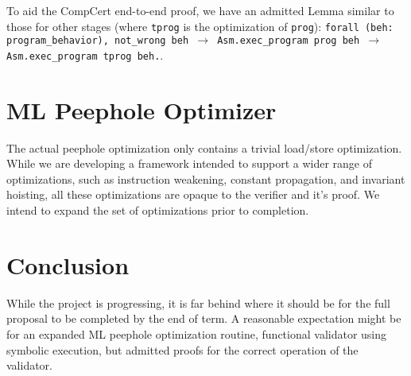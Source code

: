 \documentclass{article}
\begin{document}
To aid the CompCert end-to-end proof, we have an admitted Lemma
similar to those for other stages (where {\tt tprog} is the
optimization of {\tt prog}): {\tt forall (beh: program\_behavior),
  not\_wrong beh $\rightarrow$ Asm.exec\_program prog beh
  $\rightarrow$ Asm.exec\_program tprog beh.}.

\section{ML Peephole Optimizer}
The actual peephole optimization only contains a trivial load/store
optimization.  While we are developing a framework intended to support
a wider range of optimizations, such as instruction weakening,
constant propagation, and invariant hoisting, all these optimizations
are opaque to the verifier and it's proof.  We intend to expand the
set of optimizations prior to completion.

\section{Conclusion}
While the project is progressing, it is far behind where it should be
for the full proposal to be completed by the end of term.  A
reasonable expectation might be for an expanded ML peephole
optimization routine, functional validator using symbolic execution,
but admitted proofs for the correct operation of the validator.
\end{document}
